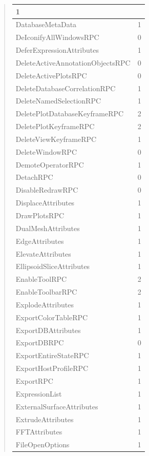 \documentclass[letterpaper,10pt,english]{sphinxmanual}
\begin{document}
\begin{quote}
\begin{longtable}{|l|l|}
1
\\
\hline
DatabaseMetaData
 & 
1
\\
\hline
DeIconifyAllWindowsRPC
 & 
0
\\
\hline
DeferExpressionAttributes
 & 
1
\\
\hline
DeleteActiveAnnotationObjectsRPC
 & 
0
\\
\hline
DeleteActivePlotsRPC
 & 
0
\\
\hline
DeleteDatabaseCorrelationRPC
 & 
1
\\
\hline
DeleteNamedSelectionRPC
 & 
1
\\
\hline
DeletePlotDatabaseKeyframeRPC
 & 
2
\\
\hline
DeletePlotKeyframeRPC
 & 
2
\\
\hline
DeleteViewKeyframeRPC
 & 
1
\\
\hline
DeleteWindowRPC
 & 
0
\\
\hline
DemoteOperatorRPC
 & 
1
\\
\hline
DetachRPC
 & 
0
\\
\hline
DisableRedrawRPC
 & 
0
\\
\hline
DisplaceAttributes
 & 
1
\\
\hline
DrawPlotsRPC
 & 
1
\\
\hline
DualMeshAttributes
 & 
1
\\
\hline
EdgeAttributes
 & 
1
\\
\hline
ElevateAttributes
 & 
1
\\
\hline
EllipsoidSliceAttributes
 & 
1
\\
\hline
EnableToolRPC
 & 
2
\\
\hline
EnableToolbarRPC
 & 
2
\\
\hline
ExplodeAttributes
 & 
1
\\
\hline
ExportColorTableRPC
 & 
1
\\
\hline
ExportDBAttributes
 & 
1
\\
\hline
ExportDBRPC
 & 
0
\\
\hline
ExportEntireStateRPC
 & 
1
\\
\hline
ExportHostProfileRPC
 & 
1
\\
\hline
ExportRPC
 & 
1
\\
\hline
ExpressionList
 & 
1
\\
\hline
ExternalSurfaceAttributes
 & 
1
\\
\hline
ExtrudeAttributes
 & 
1
\\
\hline
FFTAttributes
 & 
1
\\
\hline
FileOpenOptions
 & 
1
\\

\end{longtable}
\end{quote}
\end{document}
